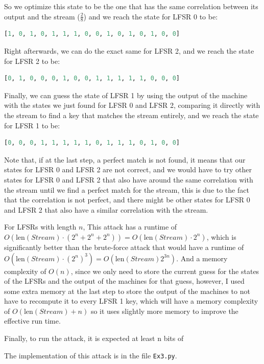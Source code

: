 \documentclass{article}
\begin{document}
So we optimize this state to be the one that has the same correlation between its output and the stream ($\frac{2}{8}$) and we reach the state for LFSR 0 to be:
\begin{lstlisting}[language=Python]
[1, 0, 1, 0, 1, 1, 1, 0, 0, 1, 0, 1, 0, 1, 0, 0]
\end{lstlisting}

Right afterwards, we can do the exact same for LFSR 2, and we reach the state for LFSR 2 to be:
\begin{lstlisting}[language=Python]
[0, 1, 0, 0, 0, 1, 0, 0, 1, 1, 1, 1, 1, 0, 0, 0]
\end{lstlisting}

Finally, we can guess the state of LFSR 1 by using the output of the machine with the states we just found for LFSR 0 and LFSR 2, comparing it directly with the stream to find a key that matches the stream entirely, and we reach the state for LFSR 1 to be:
\begin{lstlisting}[language=Python]
[0, 0, 0, 1, 1, 1, 1, 1, 0, 1, 1, 1, 0, 1, 0, 0]
\end{lstlisting}

Note that, if at the last step, a perfect match is not found, it means that our states for LFSR 0 and LFSR 2 are not correct, and we would have to try other states for LFSR 0 and LFSR 2 that also have around the same correlation with the stream until we find a perfect match for the stream, this is due to the fact that the correlation is not perfect, and there might be other states for LFSR 0 and LFSR 2 that also have a similar correlation with the stream.

For LFSRs with length $n$, This attack has a runtime of $O(\text{len}(Stream) \cdot (2^{n} + 2^{n} + 2^{n})) = O(\text{len}(Stream) \cdot 2^{n})$, which is significantly better than the brute-force attack that would have a runtime of $O(\text{len}(Stream) \cdot \left(2^{n}\right)^3) = O(\text{len}(Stream) 2^{3n})$.
And a memory complexity of $O(n)$, since we only need to store the current guess for the states of the LFSRs and the output of the machines for that guess, however, I used some extra memory at the last step to store the output of the machines to not have to recompute it to every LFSR 1 key, which will have a memory complexity of $O(\text{len}(Stream) + n)$ so it uses slightly more memory to improve the effective run time.

Finally, to run the attack, it is expected at least n bits of 

The implementation of this attack is in the file \texttt{Ex3.py}.
\end{document}
